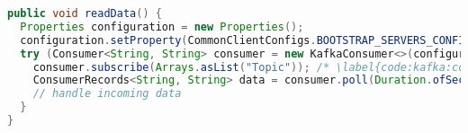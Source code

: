 
\begin{lstlisting}[language=Java, caption={Example of reading data using Kafka Consumer}, label={code:kafka:consumer}]
public void readData() {
  Properties configuration = new Properties();
  configuration.setProperty(CommonClientConfigs.BOOTSTRAP_SERVERS_CONFIG, "localhost:9092"); /* \label{code:kafka:consumer:properties} */
  try (Consumer<String, String> consumer = new KafkaConsumer<>(configuration)) {
    consumer.subscribe(Arrays.asList("Topic")); /* \label{code:kafka:consumer:subscribe} */
    ConsumerRecords<String, String> data = consumer.poll(Duration.ofSeconds(1)); /* \label{code:kafka:consumer:poll} */
    // handle incoming data
  }
}
\end{lstlisting}
